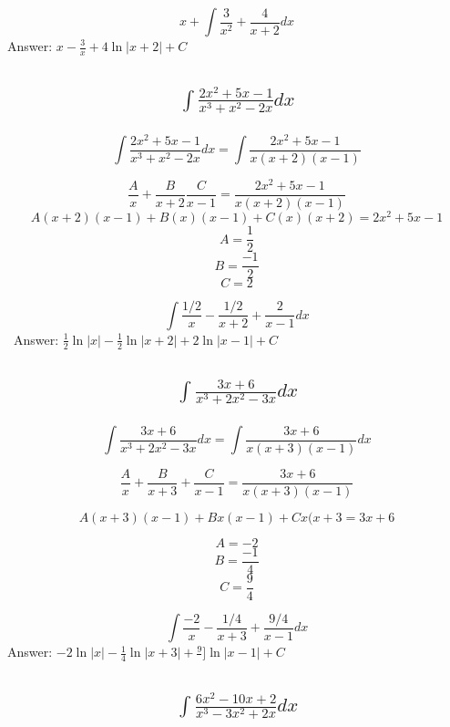 \documentclass{article}
\begin{document}
\bigskip

\[ x+ \int \frac{3}{x^2} + \frac{4}{x+2} dx\]
Answer: $x - \frac{3}{x} +4 \ln{|x+2|} +C$

\subsection{
	\begin{align*}
		\int{\frac{2x^2 + 5x - 1}{x^3 + x^2 - 2x} dx}
	\end{align*}
}

\[ \int{\frac{2x^2 + 5x - 1}{x^3 + x^2 - 2x} dx} = \int \frac{2x^2 + 5x - 1}{x(x+2)(x-1)}\]

\bigskip

\[ \frac{A}{x} +\frac{B}{x+2} \frac{C}{x-1} = \frac{2x^2 + 5x - 1}{x(x+2)(x-1)} \]
\[ A(x+2)(x-1) +B(x)(x-1) +C(x)(x+2) = 2x^2 + 5x - 1 \]
\[ A = \frac{1}{2} \]
\[B = \frac{-1}{2} \]
\[ C = 2 \]

\bigskip

\[ \int \frac{1/2}{x} - \frac{1/2}{x+2} + \frac{2}{x-1} dx\]\
Answer: $ \frac{1}{2} \ln{|x|} - \frac{1}{2} \ln{|x+2|} + 2 \ln{|x-1|} +C$ 

\subsection{
	\begin{align*}
		\int{\frac{3x + 6}{x^3 + 2x^2 - 3x} dx}
	\end{align*}
}

\[ \int{\frac{3x + 6}{x^3 + 2x^2 - 3x} dx} = \int \frac{3x+6}{x(x+3)(x-1)} dx \] 

\bigskip 

\[ \frac{A}{x} +\frac{B}{x+3} +\frac{C}{x-1} = \frac{3x+6}{x(x+3)(x-1)} \] 

\[ A(x+3)(x-1) + Bx(x-1) +Cx(x+3 = 3x+6 \] 

\[ A=-2\]
\[B=\frac{-1}{4}\]
\[C=\frac{9}{4}\]

\bigskip

\[ \int \frac{-2}{x} -\frac{1/4}{x+3} + \frac{9/4}{x-1} dx\]
Answer: $-2 \ln{|x|} - \frac{1}{4} \ln{|x+3|} + \frac{9}{}] \ln{|x-1|} +C$

\subsection{
	\begin{align*}
		\int{\frac{6x^2 - 10x + 2}{x^3 - 3x^2 + 2x} dx}
	\end{align*} 
}
\end{document}
